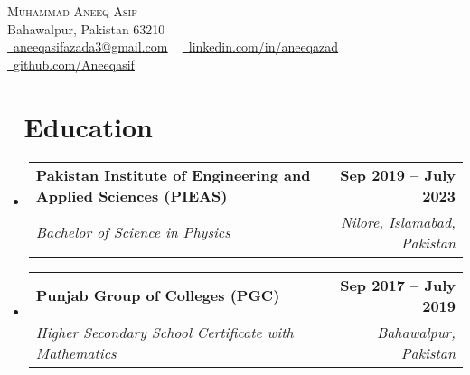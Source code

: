 \documentclass[a4paper,11pt]{article}
\makeatletter
\newcommand{\resumeSubheading}[4]{
  \vspace{-2pt}\item
    \begin{tabular*}{1.0\textwidth}[t]{l@{\extracolsep{\fill}}r}
      \textbf{\small #1} & \textbf{\small #2} \\
      \textit{\small#3} & \textit{\small #4} \\
    \end{tabular*}\vspace{-7pt}
}
\newcommand{\resumeSubHeadingListStart}{\begin{itemize}[leftmargin=0.0in, label={}]}
\newcommand{\resumeSubHeadingListEnd}{\end{itemize}}
\makeatother
\begin{document}

\begin{center}
    {\Huge \scshape Muhammad Aneeq Asif} \\ \vspace{3pt}
    Bahawalpur, Pakistan 63210 \\ \vspace{2pt}
    \href{mailto:aneeqasifazada3@gmail.com}{\raisebox{-0.1\height}\faEnvelope\  \underline{aneeqasifazada3@gmail.com}} ~
    \href{https://www.linkedin.com/in/aneeqazad}{\raisebox{-0.1\height}\faLinkedin\ \underline{linkedin.com/in/aneeqazad}}  ~
    \href{https://github.com/Aneeqasif}{\raisebox{-0.1\height}\faGithub\ \underline{github.com/Aneeqasif}}
    \vspace{5pt}
\end{center}


\section[Education]{{\FAS  }  Education} %
  \resumeSubHeadingListStart
    \resumeSubheading
      {Pakistan Institute of Engineering and Applied Sciences (PIEAS)}{Sep 2019 -- July 2023}
      {Bachelor of Science in Physics}{Nilore, Islamabad, Pakistan}
  \resumeSubHeadingListEnd

\vspace{-12pt}

  \resumeSubHeadingListStart
    \resumeSubheading
      {Punjab Group of Colleges (PGC)}{Sep 2017 -- July 2019}
      {Higher Secondary School Certificate with Mathematics}{Bahawalpur, Pakistan}
  \resumeSubHeadingListEnd
\vspace{-10pt}

\end{document}
